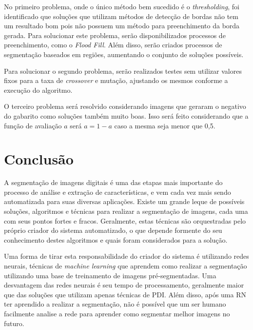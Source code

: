\documentclass[12pt,oneside,a4paper,english,french,spanish,brazil,]{abntex2}
\begin{document}
No primeiro problema, onde o único método bem sucedido é o \textit{thresholding}, foi identificado que soluções que utilizam métodos de detecção de bordas não tem um resultado bom pois não possuem um método para preenchimento da borda gerada. Para solucionar este problema, serão disponibilizados processos de preenchimento, como o \textit{Flood Fill}. Além disso, serão criados processos de segmentação baseados em regiões, aumentando o conjunto de soluções possíveis.

Para solucionar o segundo problema, serão realizados testes sem utilizar valores fixos para a taxa de \textit{crossover} e mutação, ajustando os mesmos conforme a execução do algoritmo.

O terceiro problema será resolvido considerando imagens que geraram o negativo do gabarito como soluções também muito boas. Isso será feito considerando que a função de avaliação \(a\) será \(a = 1 - a\) caso a mesma seja menor que 0,5.

% 

\chapter{Conclusão}
\label{chap:Conclusao}
\label{chap:ultimo}

A segmentação de imagens digitais é uma das etapas mais importante do processo de análise e extração de características, e vem cada vez mais sendo automatizada para suas diversas aplicações. Existe um grande leque de possíveis soluções, algoritmos e técnicas para realizar a segmentação de imagens, cada uma com seus pontos fortes e fracos. Geralmente, estas técnicas são orquestradas pelo próprio criador do sistema automatizado, o que depende formente do seu conhecimento destes algoritmos e quais foram considerados para a solução.

Uma forma de tirar esta responsabilidade do criador do sistema é utilizando redes neurais, técnicas de \textit{machine learning} que aprendem como realizar a segmentação utilizando uma base de treinamento de imagens pré-segmentadas. Uma desvantagem das redes neurais é seu tempo de processamento, geralmente maior que das soluções que utilizam apenas técnicas de PDI. Além disso, após uma RN ter aprendido a realizar a segmentação, não é possível que um ser humano facilmente analise a rede para aprender como segmentar melhor imagens no futuro.
\end{document}
